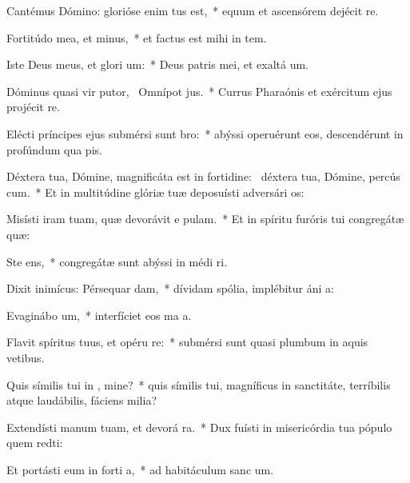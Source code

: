\item Cantémus Dómino: glorióse enim tus est,~* equum et ascensórem dejécit  re.
\item Fortitúdo mea, et   minus,~* et factus est mihi in tem.
\item Iste Deus meus, et glori um:~* Deus patris mei, et exaltá um.
\item Dóminus quasi vir putor,~\pscross{} Omnípot  jus.~* Currus Pharaónis et exércitum ejus projécit  re.
\item Elécti príncipes ejus submérsi sunt   bro:~* abýssi operuérunt eos, descendérunt in profúndum qua pis.
\item Déxtera tua, Dómine, magnificáta est in fortidine:~\pscross{} déxtera tua, Dómine, percús cum.~* Et in multitúdine glóriæ tuæ deposuísti adversári os:
\item Misísti iram tuam, quæ devorávit e  pulam.~* Et in spíritu furóris tui congregátæ  quæ:
\item Ste  ens,~* congregátæ sunt abýssi in médi ri.
\item Dixit inimícus: Pérsequar  dam,~* dívidam spólia, implébitur áni a:
\item Evaginábo  um,~* interfíciet eos ma a.
\item Flavit spíritus tuus, et opéru  re:~* submérsi sunt quasi plumbum in aquis vetibus.
\item Quis símilis tui in , mine?~* quis símilis tui, magníficus in sanctitáte, terríbilis atque laudábilis, fáciens milia?
\item Extendísti manum tuam, et devorá  ra.~* Dux fuísti in misericórdia tua pópulo quem redti:
\item Et portásti eum in forti a,~* ad habitáculum sanc um.
